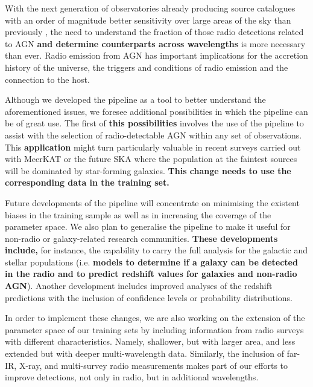 \documentclass{aa}
\begin{document}

With the next generation of observatories already producing source catalogues with an order of magnitude better sensitivity over large areas of the sky than previously \citep[e.g. RACS, EMU, and MIGHTEE; ][respectively]{2020PASA...37...48M, 2011PASA...28..215N, 2016mks..confE...6J}, the need to understand the fraction of those radio detections related to AGN \textbf{and determine counterparts across wavelengths} is more necessary than ever. Radio emission from AGN has important implications for the accretion history of the universe, the triggers and conditions of radio emission and the connection to the host.

Although we developed the pipeline as a tool to better understand the aforementioned issues, we foresee additional possibilities in which the pipeline can be of great use. The first of \textbf{this possibilities} involves the use of the pipeline to assist with the selection of radio-detectable AGN within any set of observations. This \textbf{application} might turn particularly valuable in recent surveys carried out with MeerKAT \citep{2016mks..confE...1J} or the future SKA where the population at the faintest sources will be dominated by star-forming galaxies. \textbf{This change needs to use the corresponding data in the training set.}

Future developments of the pipeline will concentrate on minimising the existent biases in the training sample as well as in increasing the coverage of the parameter space. We also plan to generalise the pipeline to make it useful for non-radio or galaxy-related research communities. \textbf{These developments include,} for instance, the capability to carry the full analysis for the galactic and stellar populations (i.e. \textbf{models to determine if a galaxy can be detected in the radio and to predict redshift values for galaxies and non-radio AGN}). Another development includes improved analyses of the redshift predictions with the inclusion of confidence levels or probability distributions.

In order to implement these changes, we are also working on the extension of the parameter space of our training sets by including information from radio surveys with different characteristics. Namely, shallower, but with larger area, and less extended but with deeper multi-wavelength data. Similarly, the inclusion of far-IR, X-ray, and multi-survey radio measurements makes part of our efforts to improve detections, not only in radio, but in additional wavelengths.
\end{document}
